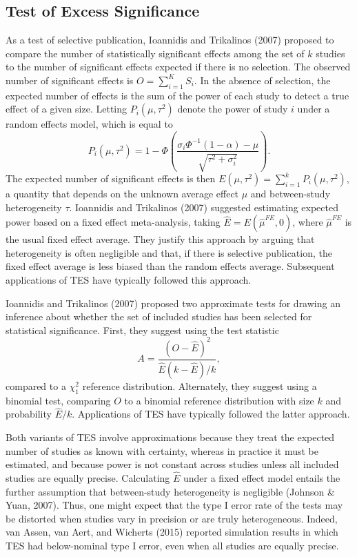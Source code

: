 \documentclass[man,floatsintext]{apa6}
\begin{document}
\hypertarget{test-of-excess-significance}{%
\subsection{Test of Excess Significance}\label{test-of-excess-significance}}

As a test of selective publication, Ioannidis and Trikalinos (2007) proposed to compare the number of statistically significant effects among the set of \(k\) studies to the number of significant effects expected if there is no selection.
The observed number of significant effects is \(O = \sum_{i=1}^K S_i\).
In the absence of selection, the expected number of effects is the sum of the power of each study to detect a true effect of a given size.
Letting \(P_i(\mu,\tau^2)\) denote the power of study \(i\) under a random effects model, which is equal to
\begin{equation} 
P_i(\mu,\tau^2) = 1 - \Phi\left( \frac{\sigma_i \Phi^{-1}(1 - \alpha) - \mu}{\sqrt{\tau^2 + \sigma_i^2}}\right).
\label{eq:power}
\end{equation}
The expected number of significant effects is then \(E(\mu, \tau^2) = \sum_{i=1}^k P_i(\mu, \tau^2)\), a quantity that depends on the unknown average effect \(\mu\) and between-study heterogeneity \(\tau\).
Ioannidis and Trikalinos (2007) suggested estimating expected power based on a fixed effect meta-analysis, taking \(\hat{E} = E(\hat\mu^{FE}, 0)\), where \(\hat\mu^{FE}\) is the usual fixed effect average.
They justify this approach by arguing that heterogeneity is often negligible and that, if there is selective publication, the fixed effect average is less biased than the random effects average.
Subsequent applications of TES have typically followed this approach.

Ioannidis and Trikalinos (2007) proposed two approximate tests for drawing an inference about whether the set of included studies has been selected for statistical significance. First, they suggest using the test statistic
\begin{equation}
A = \frac{(O - \hat{E})^2}{\hat{E}(k - \hat{E}) / k},
\label{eq:chisq-stat}
\end{equation}
compared to a \(\chi^2_1\) reference distribution.
Alternately, they suggest using a binomial test, comparing \(O\) to a binomial reference distribution with size \(k\) and probability \(\hat{E} / k\).
Applications of TES have typically followed the latter approach.

Both variants of TES involve approximations because they treat the expected number of studies as known with certainty, whereas in practice it must be estimated, and because power is not constant across studies unless all included studies are equally precise.
Calculating \(\hat{E}\) under a fixed effect model entails the further assumption that between-study heterogeneity is negligible (Johnson \& Yuan, 2007).
Thus, one might expect that the type I error rate of the tests may be distorted when studies vary in precision or are truly heterogeneous.
Indeed, van Assen, van Aert, and Wicherts (2015) reported simulation results in which TES had below-nominal type I error, even when all studies are equally precise.
\end{document}
